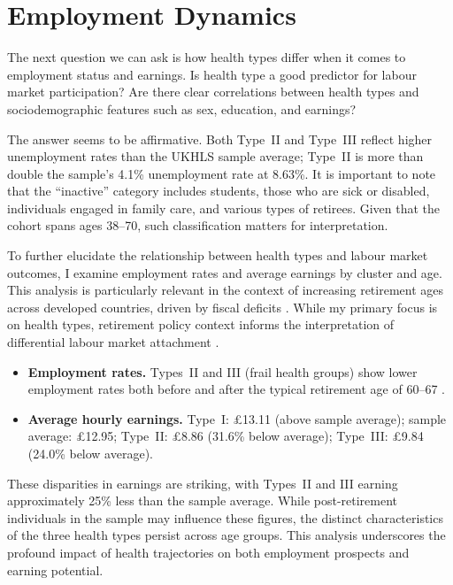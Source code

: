 \section{Employment Dynamics}
The next question we can ask is how health types differ when it comes to employment status and earnings. Is health type a good predictor for labour market participation? Are there clear correlations between health types and sociodemographic features such as sex, education, and earnings?

The answer seems to be affirmative. Both Type~II and Type~III reflect higher unemployment rates than the UKHLS sample average; Type~II is more than double the sample's 4.1\% unemployment rate at 8.63\%. It is important to note that the ``inactive'' category includes students, those who are sick or disabled, individuals engaged in family care, and various types of retirees. Given that the cohort spans ages 38--70, such classification matters for interpretation.

To further elucidate the relationship between health types and labour market outcomes, I examine employment rates and average earnings by cluster and age. This analysis is particularly relevant in the context of increasing retirement ages across developed countries, driven by fiscal deficits \citep{bbc2023_pension}. While my primary focus is on health types, retirement policy context informs the interpretation of differential labour market attachment \citep{usnews_retirement}.

\begin{itemize}
    \item \textbf{Employment rates.} Types~II and III (frail health groups) show lower employment rates both before and after the typical retirement age of 60--67 \citep{usnews_retirement}.
    \item \textbf{Average hourly earnings.} Type~I: \pounds13.11 (above sample average); sample average: \pounds12.95; Type~II: \pounds8.86 (31.6\% below average); Type~III: \pounds9.84 (24.0\% below average).
\end{itemize}

These disparities in earnings are striking, with Types~II and III earning approximately 25\% less than the sample average. While post-retirement individuals in the sample may influence these figures, the distinct characteristics of the three health types persist across age groups. This analysis underscores the profound impact of health trajectories on both employment prospects and earning potential.


